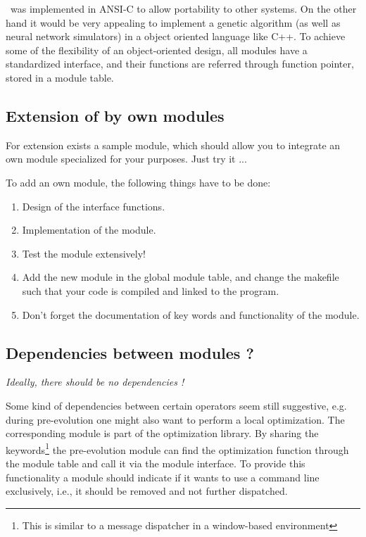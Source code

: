 \ENZO\ was implemented in ANSI-C to allow  portability to
other systems. On the other hand it would be very appealing to implement
a genetic algorithm (as well as neural network simulators)
in a object oriented language like C++.
To achieve some of the flexibility of an object-oriented design,
all modules have a standardized interface, and  their functions are referred through
function pointer, stored in a module table.


\subsection{Extension of \ENZO by own modules}

For extension exists a sample module, which should allow you
to integrate an own module specialized for your purposes.
Just try it ...

To add an own module, the following things have to be done:
\begin{enumerate}
  \item Design of the interface functions.
  \item Implementation of the module.
  \item Test the module extensively!
  \item Add the new module in the global module table, and change
        the makefile such that your code is compiled and linked to the program.
\item	Don't forget the documentation of key words and functionality of the module.
\end{enumerate}



\subsection{Dependencies between modules \label{abh} ?}

\centerline{\em Ideally, there should be no dependencies !}

Some kind of dependencies between certain operators seem still
suggestive, e.g. during pre-evolution one might also want to
perform a local optimization. The corresponding module is part
of the optimization library. By sharing the keywords\footnote{This is similar to
a message dispatcher in a window-based environment}
the pre-evolution module
can find the optimization function through the module table
and call it via the module interface.
To provide this functionality a module should indicate if
it wants to use a command line exclusively, i.e., it should be removed
and not further dispatched.



